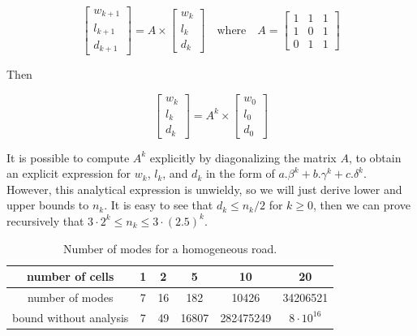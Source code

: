 \begin{equation}
\left[ \begin{array}{c}
w_{k+1} \\
l_{k+1} \\
d_{k+1} \end{array} \right] = A \times 
\left[ \begin{array}{c}
w_{k} \\
l_{k} \\
d_{k} \end{array} \right]
\quad\text{where}\quad A = \left[ \begin{array}{ccc}
1 & 1 & 1 \\
1 & 0 & 1 \\
0 & 1 & 1 \end{array} \right]\label{eq:modes4}
\end{equation}

Then 

\begin{equation}
\left[ \begin{array}{c}
w_{k} \\
l_{k} \\
d_{k} \end{array} \right] = A^{k} \times 
\left[ \begin{array}{c}
w_{0} \\
l_{0} \\
d_{0} \end{array} \right]\label{eq:modes5}
\end{equation}

It is possible to compute $A^{k}$ explicitly by diagonalizing the matrix $A$, to obtain an explicit expression for $w_{k}$, $l_{k}$, and $d_{k}$ in the form of $a.\beta^{k} + b.\gamma^{k} + c.\delta^{k}$. However, this analytical expression is unwieldy, so we will just derive lower and upper bounds to $n_{k}$. It is easy to see that $d_{k} \leq n_{k}/2$ for $k\geq 0$, then we can prove recursively that $3\cdot2^{k} \leq n_{k} \leq 3\cdot(2.5)^{k}$.

\begin{table}[ht]
\centering %
\begin{tabular}{|c|c|c|c|c|c|}
  \hline
 number of cells & 1 & 2 & 5 & 10 & 20\\
  \hline
 number of modes & 7 & 16 & 182 & 10426 & 34206521\\
  \hline
 bound without analysis & 7 & 49 & 16807 & 282475249 & $8\cdot 10^{16}$\\
  \hline
\end{tabular}
\label{table:numModes} %
\caption{Number of modes for a homogeneous road.}
\end{table}


